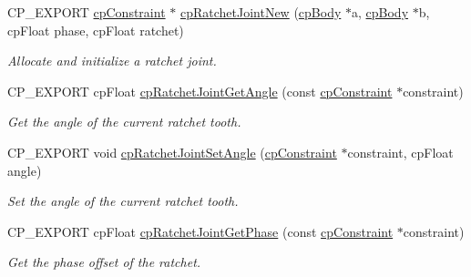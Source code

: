 \begin{DoxyCompactItemize}
\mbox{\label{group__cpRatchetJoint_gae2ff6881ee02269ea7b0de5f7471076a}} 
C\+P\+\_\+\+E\+X\+P\+O\+RT \hyperlink{structcpConstraint}{cp\+Constraint} $\ast$ \hyperlink{group__cpRatchetJoint_gae2ff6881ee02269ea7b0de5f7471076a}{cp\+Ratchet\+Joint\+New} (\hyperlink{structcpBody}{cp\+Body} $\ast$a, \hyperlink{structcpBody}{cp\+Body} $\ast$b, cp\+Float phase, cp\+Float ratchet)
\begin{DoxyCompactList}\small\item\em Allocate and initialize a ratchet joint. \end{DoxyCompactList}\item 
\mbox{\label{group__cpRatchetJoint_gafa3aadeeff9c829c323c136b3778e4b5}} 
C\+P\+\_\+\+E\+X\+P\+O\+RT cp\+Float \hyperlink{group__cpRatchetJoint_gafa3aadeeff9c829c323c136b3778e4b5}{cp\+Ratchet\+Joint\+Get\+Angle} (const \hyperlink{structcpConstraint}{cp\+Constraint} $\ast$constraint)
\begin{DoxyCompactList}\small\item\em Get the angle of the current ratchet tooth. \end{DoxyCompactList}\item 
\mbox{\label{group__cpRatchetJoint_gaec8e1e9ed802b4e042a2901cb83fa6a8}} 
C\+P\+\_\+\+E\+X\+P\+O\+RT void \hyperlink{group__cpRatchetJoint_gaec8e1e9ed802b4e042a2901cb83fa6a8}{cp\+Ratchet\+Joint\+Set\+Angle} (\hyperlink{structcpConstraint}{cp\+Constraint} $\ast$constraint, cp\+Float angle)
\begin{DoxyCompactList}\small\item\em Set the angle of the current ratchet tooth. \end{DoxyCompactList}\item 
\mbox{\label{group__cpRatchetJoint_ga7375d4a050643c7ae9c33425ccd5e88c}} 
C\+P\+\_\+\+E\+X\+P\+O\+RT cp\+Float \hyperlink{group__cpRatchetJoint_ga7375d4a050643c7ae9c33425ccd5e88c}{cp\+Ratchet\+Joint\+Get\+Phase} (const \hyperlink{structcpConstraint}{cp\+Constraint} $\ast$constraint)
\begin{DoxyCompactList}\small\item\em Get the phase offset of the ratchet. \end{DoxyCompactList}\item 
\mbox{\label{group__cpRatchetJoint_ga19d03c89211a4fb3497e1858fa4cc710}} 

\end{DoxyCompactItemize}
